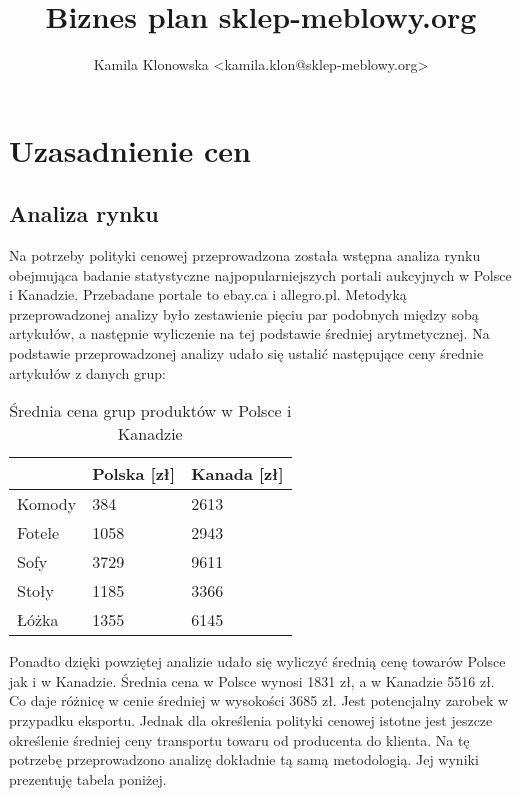 \documentclass[
12pt, %
a4paper
]{report}
\title{Biznes plan sklep-meblowy.org}
\author{Kamila Klonowska <kamila.klon@sklep-meblowy.org>}
\newcommand\blankpage{%
    \null
	\ClearWallPaper
    \thispagestyle{empty}%
    \addtocounter{page}{-1}%
    \newpage
	\ULCornerWallPaper{1}{head}}
\begin{document}
			


	

	\afterpage{\blankpage}
	
	
	
	\chapter{Uzasadnienie cen}
	\section{Analiza rynku}
		\par Na potrzeby polityki cenowej przeprowadzona została wstępna analiza rynku obejmująca badanie statystyczne najpopularniejszych portali aukcyjnych w Polsce i Kanadzie. Przebadane portale to ebay.ca i allegro.pl. Metodyką przeprowadzonej analizy było zestawienie pięciu par podobnych między sobą artykułów, a następnie wyliczenie na tej podstawie średniej arytmetycznej. Na podstawie przeprowadzonej analizy udało się ustalić następujące ceny średnie artykułów z danych grup:
		
		\begin{table}[H]
		\centering
		\begin{tabular}{|l|l|l|}
		\hline
					& Polska [zł] & Kanada [zł]\\ \hline
		Komody 	& 384  & 2613 \\ \hline
		Fotele 	& 1058 & 2943 \\ \hline
		Sofy   	& 3729 & 9611 \\ \hline
		Stoły  	& 1185 & 3366 \\ \hline
		Łóżka  	& 1355 & 6145 \\ \hline
		\end{tabular}
		\caption{Średnia cena grup produktów w Polsce i Kanadzie}
		\label{avg_grp_price_ca_pl}
		\end{table}

		Ponadto dzięki powziętej analizie udało się wyliczyć średnią cenę towarów Polsce jak i w Kanadzie. Średnia cena w Polsce wynosi 1831 zł, a w Kanadzie 5516 zł. Co daje różnicę w cenie średniej w wysokości 3685 zł. Jest potencjalny zarobek w przypadku eksportu. Jednak dla określenia polityki cenowej istotne jest jeszcze określenie średniej ceny transportu towaru od producenta do klienta. Na tę potrzebę przeprowadzono analizę dokładnie tą samą metodologią. Jej wyniki prezentuję tabela poniżej.
		
\end{document}
